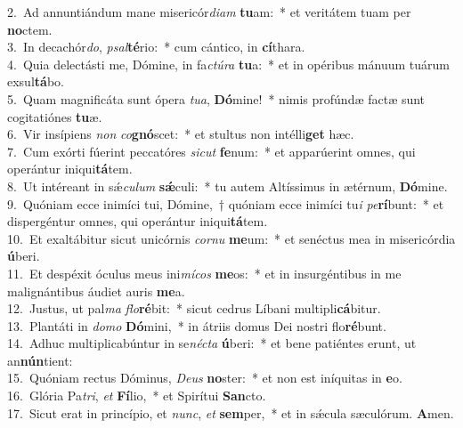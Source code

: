 {2.~}Ad annuntiándum mane misericór\textit{di}\textit{am} \textbf{tu}am:~* et veritátem tuam per \textbf{no}ctem.\\
{3.~}In decachór\textit{do}, \textit{psal}\textbf{té}rio:~* cum cántico, in \textbf{cí}thara.\\
{4.~}Quia delectásti me, Dómine, in fa\textit{ctú}\textit{ra} \textbf{tu}a:~* et in opéribus mánuum tuárum exsul\textbf{tá}bo.\\
{5.~}Quam magnificáta sunt ópera \textit{tu}\textit{a}, \textbf{Dó}mine!~* nimis profúndæ factæ sunt cogitatiónes \textbf{tu}æ.\\
{6.~}Vir insípiens \textit{non} \textit{co}\textbf{gnó}scet:~* et stultus non intélli\textbf{get} hæc.\\
{7.~}Cum exórti fúerint peccatóres \textit{si}\textit{cut} \textbf{fe}num:~* et apparúerint omnes, qui operántur iniqui\textbf{tá}tem.\\
{8.~}Ut intéreant in sǽ\textit{cu}\textit{lum} \textbf{sǽ}culi:~* tu autem Altíssimus in ætérnum, \textbf{Dó}mine.\\
{9.~}Quóniam ecce inimíci tui, Dómine,~† quóniam ecce inimíci tu\textit{i} \textit{pe}\textbf{rí}bunt:~* et dispergéntur omnes, qui operántur iniqui\textbf{tá}tem.\\
{10.~}Et exaltábitur sicut unicórnis \textit{cor}\textit{nu} \textbf{me}um:~* et senéctus mea in misericórdia \textbf{ú}beri.\\
{11.~}Et despéxit óculus meus ini\textit{mí}\textit{cos} \textbf{me}os:~* et in insurgéntibus in me malignántibus áudiet auris \textbf{me}a.\\
{12.~}Justus, ut pal\textit{ma} \textit{flo}\textbf{ré}bit:~* sicut cedrus Líbani multipli\textbf{cá}bitur.\\
{13.~}Plantáti in \textit{do}\textit{mo} \textbf{Dó}mini,~* in átriis domus Dei nostri flo\textbf{ré}bunt.\\
{14.~}Adhuc multiplicabúntur in se\textit{né}\textit{cta} \textbf{ú}beri:~* et bene patiéntes erunt, ut an\textbf{nún}tient:\\
{15.~}Quóniam rectus Dóminus, \textit{De}\textit{us} \textbf{no}ster:~* et non est iníquitas in \textbf{e}o.\\
{16.~}Glória Pa\textit{tri}, \textit{et} \textbf{Fí}lio,~* et Spirítui \textbf{San}cto.\\
{17.~}Sicut erat in princípio, et \textit{nunc}, \textit{et} \textbf{sem}per,~* et in sǽcula sæculórum. \textbf{A}men.\\
